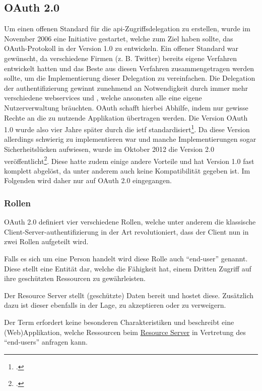 \subsection{OAuth 2.0}\label{subsec:oauth-2.0}
	Um einen offenen Standard für die \gls{api}-Zugriffsdelegation zu erstellen,
	wurde im November 2006 eine Initiative gestartet,
	welche zum Ziel haben sollte,
	das OAuth-Protokoll in der Version 1.0 zu entwickeln.
	Ein offener Standard war gewünscht,
	da verschiedene Firmen (z. B. Twitter) bereits eigene Verfahren entwickelt hatten
	und das Beste aus diesen Verfahren zusammengetragen werden sollte,
	um die Implementierung dieser Delegation zu vereinfachen.
	Die Delegation der \gls{authentifizierung} gewinnt zunehmend an Notwendigkeit
	durch immer mehr verschiedene \glspl{webservice} und \webApplications,
	welche ansonsten alle eine eigene Nutzerverwaltung bräuchten.
	OAuth schafft hierbei Abhilfe,
	indem nur gewisse Rechte an die zu nutzende Applikation übertragen werden.
	Die Version OAuth 1.0 wurde also vier Jahre später durch die \gls{ietf} standardisiert\footcite[Vgl.][]{rfc5849}.
	Da diese Version allerdings schwierig zu implementieren war und
	manche Implementierungen sogar Sicherheitslücken aufwiesen,
	wurde im Oktober 2012 die Version 2.0 veröffentlicht\footcite[Vgl.][]{rfc6749}.
	Diese hatte zudem einige andere Vorteile und hat Version 1.0 fast komplett abgelöst,
	da unter anderem auch keine Kompatibilität gegeben ist.
	Im Folgenden wird daher nur auf OAuth 2.0 eingegangen.

	\subsubsection{Rollen}\label{subsubsec:rollen}
		OAuth 2.0 definiert vier verschiedene Rollen,
		welche unter anderem die klassische Client-Server-\gls{authentifizierung} in der Art revolutioniert,
		dass der Client nun in zwei Rollen aufgeteilt wird.

		Falls es sich um eine Person handelt wird diese Rolle auch \enquote{end-user} genannt.
		Diese stellt eine Entität dar,
		welche die Fähigkeit hat,
		einem Dritten Zugriff auf ihre geschützten Ressourcen zu gewährleisten.

		Der Resource Server stellt (geschützte) Daten bereit
		und hostet diese.
		Zusätzlich dazu ist dieser ebenfalls in der Lage,
		\accessToken{} zu akzeptieren oder zu verweigern.

		Der Term \client{} erfordert keine besonderen Charakteristiken
		und beschreibt eine (Web)\-Applikation,
		welche Ressourcen beim \hyperref[par:resource-server]{Resource Server} in Vertretung
		des \enquote{end-users} anfragen kann.

